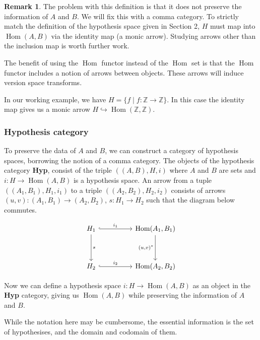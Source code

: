 \documentclass{article}
\theoremstyle{definition}
\newtheorem*{remark}{Remark}
\begin{document}
\begin{remark}
The problem with this definition is that it does not preserve the information of $A$ and $B$. We will fix this with a comma category. To strictly match the definition of the hypothesis space given in Section 2, $H$ must map into $\operatorname{Hom}(A,B)$ via the identity map (a monic arrow). Studying arrows other than the inclusion map is worth further work.
\end{remark}  

The benefit of using the $\operatorname{Hom}$ functor instead of the $\operatorname{Hom}$ set is that the $\operatorname{Hom}$ functor includes a notion of arrows between objects. These arrows will induce version space transforms. 

In our working example, we have $H=\{f \mid f: \mathbb{Z} \rightarrow \mathbb{Z}\}$. In this case the identity map gives us a monic arrow $H \hookrightarrow \operatorname{Hom}(\mathbb{Z}, \mathbb{Z})$.  

\subsubsection{Hypothesis category}
To preserve the data of $A$ and $B$, we can construct a category of hypothesis spaces, borrowing the notion of a comma category. The objects of the hypothesis category \textbf{Hyp}, consist of the triple $((A,B),H,i)$ where $A$ and $B$ are sets and $i:H \rightarrow \operatorname{Hom}(A,B)$ is a hypothesis space. An arrow from a tuple $((A_1,B_1),H_1,i_1)$ to a triple $((A_2,B_2), H_2, i_2)$ consists of arrows $(u,v):(A_1,B_1) \rightarrow (A_2,B_2)$, $s:H_1 \rightarrow H_2$ such that the diagram below commutes. 

\[\begin{tikzcd}
	{H_1} && {\operatorname{Hom}(A_1,B_1)} \\
	\\
	{H_2} && {\operatorname{Hom}(A_2,B_2)}
	\arrow["s", from=1-1, to=3-1]
	\arrow["i_1", hook, from=1-1, to=1-3]
	\arrow["i_2", hook, from=3-1, to=3-3]
	\arrow["{(u, v)^*}"', from=1-3, to=3-3]
\end{tikzcd}\]

Now we can define a hypothesis space $i:H\rightarrow \operatorname{Hom}(A,B)$ as an object in the \textbf{Hyp} category, giving us $\operatorname{Hom}(A,B)$ while preserving the information of $A$ and $B$.

While the notation here may be cumbersome, the essential information is the set of hypothesises, and the domain and codomain of them.    
\end{document}
